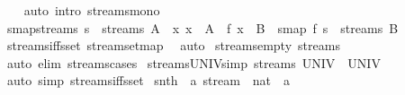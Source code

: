 \begin{isabellebody}
%
\isadelimproof
\ \ %
\endisadelimproof
%
\isatagproof
{}\isamarkupfalse%
\ {\isacharparenleft}auto\ intro{\isacharcolon}\ streams{\isacharunderscore}mono{\isacharparenright}%
\endisatagproof
{\isafoldproof}%
%
\isadelimproof
\isanewline
%
\endisadelimproof
\isanewline
{}\isamarkupfalse%
\ smap{\isacharunderscore}streams{\isacharcolon}\ {\isachardoublequoteopen}s\ {\isasymin}\ streams\ A\ {\isasymLongrightarrow}\ {\isacharparenleft}{\isasymAnd}x{\isachardot}\ x\ {\isasymin}\ A\ {\isasymLongrightarrow}\ f\ x\ {\isasymin}\ B{\isacharparenright}\ {\isasymLongrightarrow}\ smap\ f\ s\ {\isasymin}\ streams\ B{\isachardoublequoteclose}\isanewline
%
\isadelimproof
\ \ %
\endisadelimproof
%
\isatagproof
{}\isamarkupfalse%
\ streams{\isacharunderscore}iff{\isacharunderscore}sset\ stream{\isachardot}set{\isacharunderscore}map\ \isamarkupfalse%
\ auto%
\endisatagproof
{\isafoldproof}%
%
\isadelimproof
\isanewline
%
\endisadelimproof
\isanewline
{}\isamarkupfalse%
\ streams{\isacharunderscore}empty{\isacharcolon}\ {\isachardoublequoteopen}streams\ {\isacharbraceleft}{\isacharbraceright}\ {\isacharequal}\ {\isacharbraceleft}{\isacharbraceright}{\isachardoublequoteclose}\isanewline
%
\isadelimproof
\ \ %
\endisadelimproof
%
\isatagproof
{}\isamarkupfalse%
\ {\isacharparenleft}auto\ elim{\isacharcolon}\ streams{\isachardot}cases{\isacharparenright}%
\endisatagproof
{\isafoldproof}%
%
\isadelimproof
\isanewline
%
\endisadelimproof
\isanewline
{}\isamarkupfalse%
\ streams{\isacharunderscore}UNIV{\isacharbrackleft}simp{\isacharbrackright}{\isacharcolon}\ {\isachardoublequoteopen}streams\ UNIV\ {\isacharequal}\ UNIV{\isachardoublequoteclose}\isanewline
%
\isadelimproof
\ \ %
\endisadelimproof
%
\isatagproof
{}\isamarkupfalse%
\ {\isacharparenleft}auto\ simp{\isacharcolon}\ streams{\isacharunderscore}iff{\isacharunderscore}sset{\isacharparenright}%
\endisatagproof
{\isafoldproof}%
%
\isadelimproof
%
\endisadelimproof
%
\isadelimdocument
%
\endisadelimdocument
%
\isatagdocument
%
\isamarkuptrue%
%
\endisatagdocument
{\isafolddocument}%
%
\isadelimdocument
%
\endisadelimdocument
{}\isamarkupfalse%
\ snth\ {\isacharcolon}{\isacharcolon}\ {\isachardoublequoteopen}{\isacharprime}a\ stream\ {\isasymRightarrow}\ nat\ {\isasymRightarrow}\ {\isacharprime}a{\isachardoublequoteclose}\ {\isacharparenleft}\ {\isacartoucheopen}{\isacharbang}{\isacharbang}{\isacartoucheclose}\ {}{}{}{\isacharparenright}\ \isanewline

\end{isabellebody}
